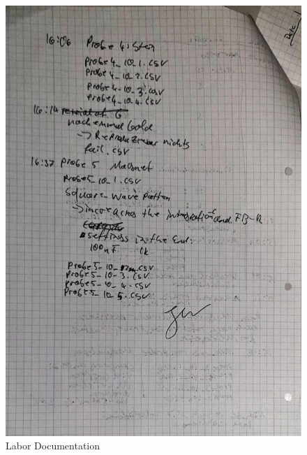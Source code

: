 \documentclass[30pt,a4paper]{article}
\begin{document}
	\begin{figure}[ht]
		\includegraphics[scale=0.3]{Bild/SQUID_(2).jpg}
		\centering
		\caption{Labor Documentation}
	\end{figure}
\end{document}

